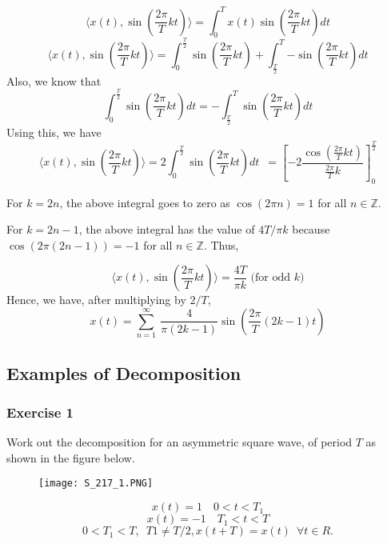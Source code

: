 \begin{equation*} \langle x(t), \sin (\frac{2\pi}{T}kt)\rangle = \int_{0}^{T} x(t)\sin (\frac{2\pi}{T}kt) dt\end{equation*}
\begin{equation*} \langle x(t), \sin (\frac{2\pi}{T}kt)\rangle = \int_{0}^{\frac{T}{2}}\sin (\frac{2\pi}{T}kt) + \int_{\frac{T}{2}}^{T}{-\sin (\frac{2\pi}{T}kt)} dt\end{equation*}
\noindent
Also, we know that 
 \begin{equation*}\int_{0}^{\frac{T}{2}}\sin (\frac{2\pi}{T}kt) dt = -\int_{\frac{T}{2}}^{T}\sin (\frac{2\pi}{T}kt) dt \end{equation*}
\noindent
Using this, we have
\begin{equation*} \langle x(t), \sin (\frac{2\pi}{T}kt)\rangle = 2\int_{0}^{\frac{T}{2}}\sin (\frac{2\pi}{T}kt)dt\enspace = \left[-2\frac{\cos (\frac{2\pi}{T}kt)}{\frac{2\pi}{T}k}\right]_0^\frac{T}{2}\end{equation*}

\noindent
For $k = 2n$, the above integral goes to zero as $\cos ({2\pi}n) = 1$ for all $n \in \mathbb{Z}$.

\noindent
For $k = 2n-1$, the above integral has the value of $4T/\pi k$ because $\cos(2{\pi}(2n-1)) = -1$ for all $n \in \mathbb{Z}$. Thus,

\begin{equation*} \langle x(t), \sin (\frac{2\pi}{T}kt)\rangle = \frac{4T}{{\pi}k} \textrm{ (for odd }k) \end{equation*}
\noindent
Hence, we have, after multiplying by $2/T$,
\begin{equation*} x(t) = \sum_{n=1}^{\infty}\ \frac{4}{{\pi}(2k-1)} \sin (\frac{2\pi}{T}(2k-1)t)\end{equation*} 

\subsection{Examples of Decomposition}
\subsubsection{Exercise 1} 
\noindent
Work out the decomposition for an asymmetric square wave, of period $T$ as shown in the figure below.
\begin{figure}[ht]
\centering
\texttt{[image: S\_217\_1.PNG]}
\end{figure}
 				\begin{equation*} x(t) = 1 \enspace \enspace      0<t<T_1 \end{equation*}
       			\begin{equation*} x(t) = -1  \enspace\enspace 	T_1 < t< T \end{equation*} \begin{equation*}0<T_1<T, \enspace T1\neq T/2, x(t+T) = x(t)\enspace  \forall t\in R.  \end{equation*}

